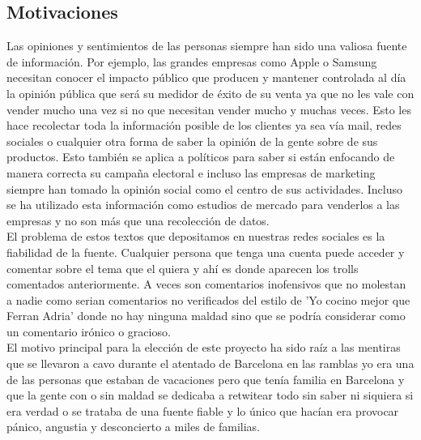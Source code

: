 \documentclass[../all.tex]{subfiles}
\begin{document}
\subsection{Motivaciones}
    Las opiniones y sentimientos de las personas siempre han sido una valiosa fuente de información. Por ejemplo, las grandes empresas como Apple o Samsung necesitan conocer el impacto público que producen y mantener controlada al día la opinión pública que será su medidor de éxito de su venta ya que no les vale con vender mucho una vez si no que necesitan vender mucho y muchas veces. Esto les hace recolectar toda la información posible de los clientes ya sea vía mail, redes sociales o cualquier otra forma de saber la opinión de la gente sobre de sus productos. Esto también se aplica a políticos para saber si están enfocando de manera correcta su campaña electoral e incluso las empresas de marketing siempre han tomado la opinión social como el centro de sus actividades. Incluso se ha utilizado esta información como estudios de mercado para venderlos a las empresas y no son más que una recolección de datos.\\
    \newline
    El problema de estos textos que depositamos en nuestras redes sociales es la fiabilidad de la fuente. Cualquier persona que tenga una cuenta puede acceder y comentar sobre el tema que el quiera y ahí es donde aparecen los trolls comentados anteriormente. A veces son comentarios inofensivos que no molestan a nadie como serian comentarios no verificados del estilo de 'Yo cocino mejor que Ferran Adria' donde no hay ninguna maldad sino que se podría considerar como un comentario irónico o gracioso.\\
    \newline
    El motivo principal para la elección de este proyecto ha sido raíz a las mentiras que se llevaron a cavo durante el atentado de Barcelona en las ramblas yo era una de las personas que estaban de vacaciones pero que tenía familia en Barcelona y que la gente con o sin maldad se dedicaba a retwitear todo sin saber ni siquiera si era verdad o se trataba de una fuente fiable y lo único que hacían era provocar pánico, angustia y desconcierto a miles de familias.
    

\newpage
\end{document}
